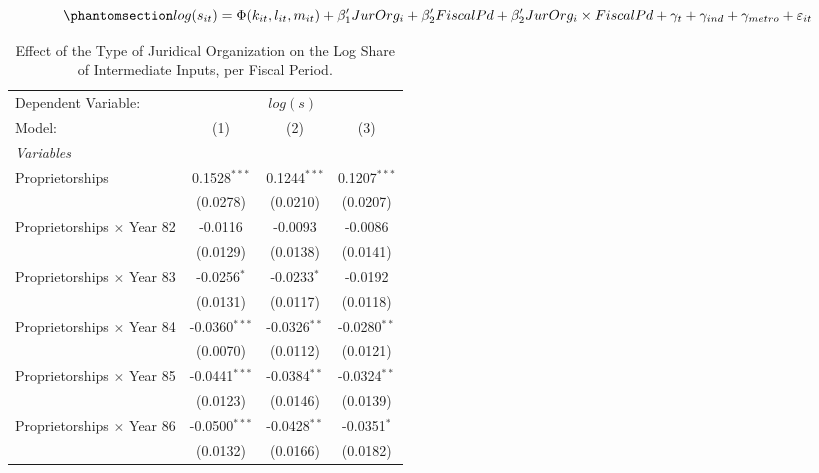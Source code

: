\documentclass[
  12pt]{article}
\theoremstyle{definition}
\theoremstyle{remark}
\begin{document}
\begin{equation}\phantomsection\label{eq-reg-tax-fp}{
log(s_{it})= \Phi(k_{it},l_{it},m_{it})+ \beta_1'JurOrg_i + \beta_2'FiscalPd+\beta_2'JurOrg_i\times FiscalPd + \gamma_t + \gamma_{ind} +\gamma_{metro} + \varepsilon_{it}
}\end{equation}

\begin{table}

\caption{\label{tbl-reg-fiscal-p}Effect of the Type of Juridical
Organization on the Log Share of Intermediate Inputs, per Fiscal
Period.}

\begin{minipage}{\linewidth}

\begingroup
\centering
\begin{tabular}{lccc}
   \tabularnewline \midrule \midrule
   Dependent Variable: & \multicolumn{3}{c}{\(log(s)\)}\\
   Model:                            & (1)             & (2)            & (3)\\  
   \midrule
   \emph{Variables}\\
   Proprietorships                   & 0.1528$^{***}$  & 0.1244$^{***}$ & 0.1207$^{***}$\\   
                                     & (0.0278)        & (0.0210)       & (0.0207)\\   
   Proprietorships $\times$ Year 82  & -0.0116         & -0.0093        & -0.0086\\   
                                     & (0.0129)        & (0.0138)       & (0.0141)\\   
   Proprietorships $\times$ Year 83  & -0.0256$^{*}$   & -0.0233$^{*}$  & -0.0192\\   
                                     & (0.0131)        & (0.0117)       & (0.0118)\\   
   Proprietorships $\times$ Year 84  & -0.0360$^{***}$ & -0.0326$^{**}$ & -0.0280$^{**}$\\   
                                     & (0.0070)        & (0.0112)       & (0.0121)\\   
   Proprietorships $\times$ Year 85  & -0.0441$^{***}$ & -0.0384$^{**}$ & -0.0324$^{**}$\\   
                                     & (0.0123)        & (0.0146)       & (0.0139)\\   
   Proprietorships $\times$ Year 86  & -0.0500$^{***}$ & -0.0428$^{**}$ & -0.0351$^{*}$\\   
                                     & (0.0132)        & (0.0166)       & (0.0182)\\   

\end{tabular}
\end{minipage}
\end{table}
\end{document}
